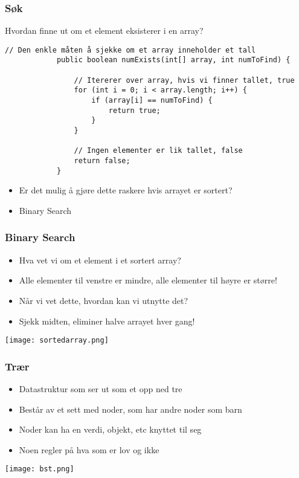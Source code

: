 \documentclass[norsk, handout]{beamer}
\begin{document}
    \begin{frame}[fragile]
        \frametitle{Søk}
        Hvordan finne ut om et element eksisterer i en array?
        \pause
        \begin{lstlisting}[basicstyle=\scriptsize]
            // Den enkle måten å sjekke om et array inneholder et tall
            public boolean numExists(int[] array, int numToFind) {

                // Itererer over array, hvis vi finner tallet, true
                for (int i = 0; i < array.length; i++) {
                    if (array[i] == numToFind) {
                        return true;
                    }
                }

                // Ingen elementer er lik tallet, false
                return false;
            }
		\end{lstlisting}

        \begin{itemize}
            \item Er det mulig å gjøre dette raskere hvis arrayet er sortert?
            \pause
        \item Binary Search {\Emoji🤯}
        \end{itemize}
    \end{frame}

    \begin{frame}
        \frametitle{Binary Search}

        \begin{itemize}
            \item Hva vet vi om et element i et sortert array?
            \pause
            \item Alle elementer til venstre er mindre, alle elementer til høyre er
                større!
            \pause
            \item Når vi vet dette, hvordan kan vi utnytte det?
            \pause
            \item Sjekk midten, eliminer halve arrayet hver gang!
        \end{itemize}
    \end{frame}

    \begin{frame}
        \texttt{[image: sortedarray.png]}
    \end{frame}


    \begin{frame}
        \frametitle{Trær}
        \begin{itemize}
            \item Datastruktur som ser ut som et opp ned tre
            \item Består av et sett med noder, som har andre noder som barn
            \item Noder kan ha en verdi, objekt, etc knyttet til seg
            \item Noen regler på hva som er lov og ikke
        \end{itemize}

        \texttt{[image: bst.png]}

    \end{frame}
\end{document}
